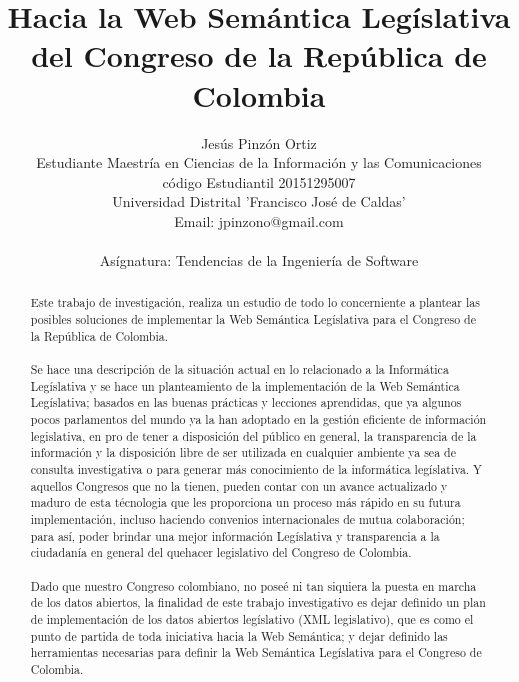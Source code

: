 \documentclass[conference]{IEEEtran}\usepackage[]{graphicx}\usepackage[]{color}
\begin{document}
\title{Hacia la Web Semántica Legíslativa del Congreso de la República de Colombia}


\author{Jesús Pinzón Ortiz\\
	Estudiante Maestría en Ciencias de la Información y las Comunicaciones\\
	código Estudiantil 20151295007\\
	Universidad Distrital 'Francisco José de Caldas'\\
	Email: jpinzono@gmail.com\\ \\
	Asígnatura: Tendencias de la Ingeniería de Software}

\maketitle

\begin{abstract}
	Este trabajo de investigación, realiza un estudio de todo lo concerniente a plantear las posibles soluciones de implementar la Web Semántica Legíslativa para el Congreso de la República de Colombia. \\ \\
	Se hace una descripción de la situación actual en lo relacionado a la Informática Legíslativa y se hace un planteamiento de la implementación de la Web Semántica Legíslativa; basados en las buenas prácticas y lecciones aprendidas, que ya algunos pocos parlamentos del mundo ya la han adoptado en la gestión eficiente de información legislativa, en pro de tener a disposición del público en general, la transparencia de la información y la disposición libre de ser utilizada en cualquier ambiente ya sea de consulta investigativa o para generar más conocimiento de la informática legíslativa.  Y aquellos Congresos que no la tienen, pueden contar con un avance actualizado y maduro de esta técnologia que les proporciona un proceso más rápido en su futura implementación, incluso haciendo convenios internacionales de mutua colaboración; para así, poder brindar una mejor información Legíslativa y transparencia a la ciudadanía en general del quehacer legislativo del Congreso de Colombia. \\ \\
	Dado que nuestro Congreso colombiano, no poseé ni tan siquiera la puesta en marcha de los datos abiertos, la finalidad de este trabajo investigativo es dejar definido un plan de implementación de los datos abiertos legíslativo (XML legislativo), que es como el punto de partida de toda iniciativa hacia la Web Semántica; y dejar definido las herramientas necesarias para definir la Web Semántica Legíslativa para el Congreso de Colombia.
\end{abstract}
\end{document}
